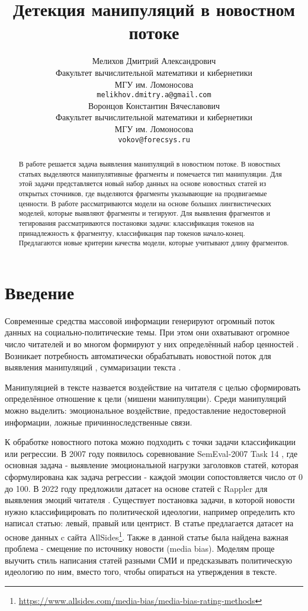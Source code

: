 \documentclass{article}
\title{Детекция манипуляций в новостном потоке}
\author{ Мелихов Дмитрий Александрович \\
        Факультет вычислительной математики и кибернетики \\
        МГУ им. Ломоносова \\
        \texttt{melikhov.dmitry.a@gmail.com} \\
	\And
	Воронцов Константин Вячеславович \\
        Факультет вычислительной математики и кибернетики \\
        МГУ им. Ломоносова \\
        \texttt{vokov@forecsys.ru} \\
}
\date{}
\begin{document}
\maketitle

\begin{abstract}
В работе решается задача выявления манипуляций в новостном потоке. В новостных статьях выделяются манипулятивные фрагменты и помечается тип манипуляции. Для этой задачи представляется новый набор данных на основе новостных статей из открытых сточников, где выделяются фрагменты указывающие на продвигаемые ценности. В работе рассматриваются модели на основе больших лингвистических моделей, которые выявляют фрагменты и тегируют. Для выявления фрагментов и тегирования рассматриваются постановки задачи: классификация токенов на принадлежность к фрагментуу, классификация пар токенов начало-конец. Предлагаются новые критерии качества модели, которые учитывают длину фрагментов.
\end{abstract}



\section{Введение}

Современные средства массовой информации генерируют огромный поток данных на социально-политические темы. При этом они охватывают огромное число читателей и во многом формируют у них определённый набор ценностей \cite{mutz2010mass}. Возникает потребность автоматически обрабатывать новостной поток для выявления манипуляций \cite{martino2020semeval}, суммаризации текста \cite{kemahduta2021automatic}.

Манипуляцией в тексте назвается воздействие на читателя с целью сформировать определённое отношение к цели (мишени манипуляции). Среди манипуляций можно выделить: эмоциональное воздействие, предоставление недостоверной информации, ложные причинноследственные связи.

К обработке новостного потока можно подходить с точки задачи классификации или регрессии. В 2007 году появилось соревнование SemEval-2007 Task 14 \cite{strapparava2007semeval}, где основная задача - выявление эмоциональной нагрузки заголовков статей, которая сформулирована как задача регрессии - каждой эмоции сопостовляется число от 0 до 100. В 2022 году предложили датасет на основе статей с Rappler для выявления эмоций читателя \cite{anoop22readers}.
Существует постановка задачи, в которой новости нужно классифицировать по политической идеологии, например определить кто написал статью: левый, правый или центрист. В статье \cite{bias} предлагается датасет на основе данных c сайта AllSides\footnote{\url{https://www.allsides.com/media-bias/media-bias-rating-methods}}. Также в данной статье была найдена важная проблема - смещение по источнику новости (media bias). Моделям проще выучить стиль написания статей разными СМИ и предсказывать политическую идеологию по ним, вместо того, чтобы опираться на утверждения в тексте.
\end{document}
